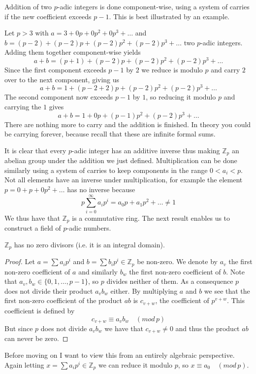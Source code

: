 Addition of two $p$-adic integers is done component-wise, using a system of carries if
the new coefficient exceeds $p-1$. This is best illustrated by an example.
\begin{ex}
 Let $p > 3$ with $a = 3 + 0p + 0p^2 + 0p^3 + \ldots$ and $b = (p-2) + (p-2)p + (p-2)p^2 + (p-2)p^3 + \ldots$
two $p$-adic integers. Adding them together component-wise yields
$$a+b = (p+1) + (p-2)p + (p-2)p^2 + (p-2)p^3 + \ldots$$
Since the first component exceeds $p-1$ by $2$ we reduce is modulo $p$ and carry $2$ over to the next
component, giving us
$$a+b = 1 + (p-2+2)p + (p-2)p^2 + (p-2)p^3 + \ldots$$
The second component now exceeds $p-1$ by $1$, so reducing it modulo $p$ and carrying the $1$ gives
$$a+b = 1 + 0p + (p-1)p^2 + (p-2)p^3 + \ldots$$
There are nothing more to carry and the addition is finished. In theory you could be carrying
forever, because recall that these are infinite formal sums.
\end{ex}
It is clear that every $p$-adic integer has an additive inverse thus making $\mathbb{Z}_p$ an
abelian group under the addition we just defined. Multiplication can be done similarly
using a system of carries to keep components in the range $0 < a_i < p$. Not all elements have
an inverse under multiplication, for example the element $p = 0 + p + 0p^2 + \ldots$ has no inverse because
$$ p\sum_{i=0}^{\infty} a_i p^i = a_0 p + a_1 p^2 + \ldots \neq 1$$
We thus have that $\mathbb{Z}_p$ is a commutative ring. The next result enables us to construct a field
of $p$-adic numbers.
\begin{prop}
 $\mathbb{Z}_p$ has no zero divisors (i.e. it is an integral domain).
\end{prop}
\begin{proof}
 Let $a = \sum a_i p^i$ and $b = \sum b_i p^i \in \mathbb{Z}_p$ be non-zero.
We denote by $a_v$ the first non-zero coefficient of $a$ and similarly $b_w$ the first non-zero
coefficient of $b$. Note that $a_v, b_w \in \{0, 1, \ldots , p-1\}$, so $p$ divides neither of them.
As a consequence $p$ does not divide their product $a_v b_w$ either. By multiplying $a$ and $b$
we see that the first non-zero coefficient of the product $ab$ is $c_{v+w}$, the coefficient of
$p^{v+w}$. This coefficient is defined by
$$ c_{v+w} \equiv a_v b_w \quad (mod\, p) $$
But since $p$ does not divide $a_v b_w$ we have that $c_{v+w} \neq 0$ and thus the product
$ab$ can never be zero.
\end{proof}
Before moving on I want to view this from an entirely algebraic perspective. Again letting
$x = \sum a_i p^i \in \mathbb{Z}_p$ we can reduce it modulo $p$, so $x \equiv a_0 \quad (mod\, p)$.
